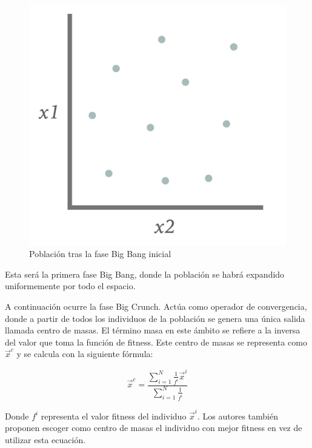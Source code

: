 \begin{figure}[H]
    \centering
        \includegraphics[scale=0.23]{img/initial_big_bang.png}
        \caption{Población tras la fase Big Bang inicial}
\end{figure}

Esta será la primera fase Big Bang, donde la población se habrá expandido uniformemente por todo el espacio.

A continuación ocurre la fase Big Crunch. Actúa como operador de convergencia, donde a partir de todos los individuos de la población se genera una única salida llamada centro de masas. El término masa en este ámbito se refiere a la inversa del valor que toma la función de fitness. Este centro de masas se representa como $\vec{x}^c$ y se calcula con la siguiente fórmula:

\begin{equation}
    \label{eqn:centromasas}
    \vec{x}^c = \frac{\sum^{N}_{i=1}\frac{1}{f^i}\vec{x}^i}{\sum^{N}_{i=1}\frac{1}{f^i}}
\end{equation}

Donde $f^i$ representa el valor fitness del individuo $\vec{x}^i$. Los autores también proponen escoger como centro de masas el individuo con mejor fitness en vez de utilizar esta ecuación.

